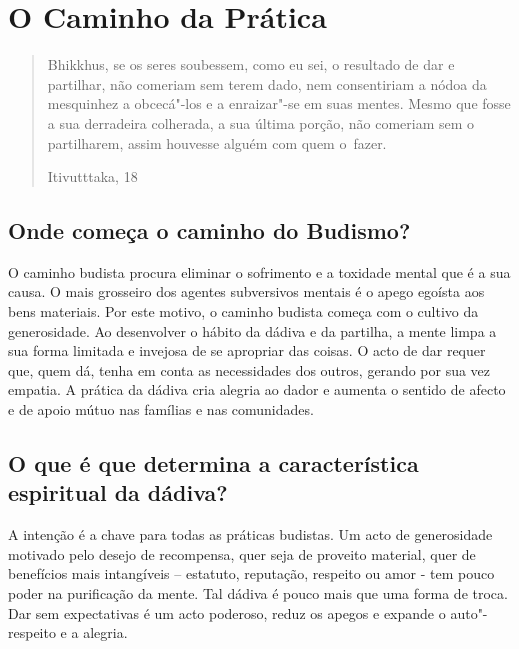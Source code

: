 

\setlength{\chapterTitleTopSkip}{0mm}

\chapter{O Caminho da Prática}

\clearpage


\begin{verse}

Bhikkhus, se os seres soubessem, como eu sei, o resultado de dar e
partilhar, não comeriam sem terem dado, nem consentiriam a nódoa da
mesquinhez a obcecá"-los e a enraizar"-se em suas mentes. Mesmo que fosse
a sua derradeira colherada, a sua última porção, não comeriam sem o
partilharem, assim houvesse alguém com quem o~fazer.

{\raggedleft
Itivutttaka, 18
\par}

\end{verse}


\section{Onde começa o caminho do Budismo?}

O caminho budista procura eliminar o sofrimento e a toxidade mental que
é a sua causa. O mais grosseiro dos agentes subversivos mentais é o
apego egoísta aos bens materiais. Por este motivo, o caminho budista
começa com o cultivo da generosidade. Ao desenvolver o hábito da dádiva
e da partilha, a mente limpa a sua forma limitada e invejosa de se
apropriar das coisas. O acto de dar requer que, quem dá, tenha em conta
as necessidades dos outros, gerando por sua vez empatia. A prática da
dádiva cria alegria ao dador e aumenta o sentido de afecto e de apoio
mútuo nas famílias e nas comunidades.

\section{O que é que determina a característica espiritual da dádiva?}

A intenção é a chave para todas as práticas budistas. Um acto de
generosidade motivado pelo desejo de recompensa, quer seja de proveito
material, quer de benefícios mais intangíveis -- estatuto, reputação,
respeito ou amor - tem pouco poder na purificação da mente. Tal dádiva
é pouco mais que uma forma de troca. Dar sem expectativas é um acto
poderoso, reduz os apegos e expande o auto"-respeito e a alegria.

